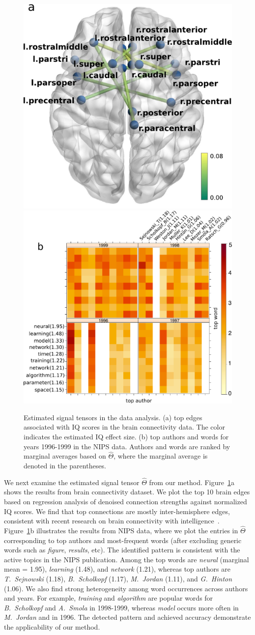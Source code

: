\documentclass[useAMS,usenatbib,usegraphicx,referee]{biom}
\theoremstyle{plain}
\theoremstyle{definition}
\begin{document}
\begin{figure}[h!]
\centering
\includegraphics[width=.36\textwidth]{figure/brainIQ.pdf}
\hspace{1cm}
\includegraphics[width=.45\textwidth]{figure/signal.pdf}
 \captionsetup{justification=raggedright,font=small}
\caption{Estimated signal tensors in the data analysis. (a) top edges associated with IQ scores in the brain connectivity data. The color indicates the estimated IQ effect size. (b) top authors and words for years 1996-1999 in the NIPS data. Authors and words are ranked by marginal averages based on $\hat \Theta$, where the marginal average is denoted in the parentheses.
}\label{fig:signal}
\end{figure}




We next examine the estimated signal tensor $\hat \Theta$ from our method. Figure~\ref{fig:signal}a shows the results from brain connectivity dataset. We plot the top 10 brain edges based on regression analysis of denoised connection strengths against normalized IQ scores. We find that top connections are mostly inter-hemisphere edges, consistent with recent research on brain connectivity with intelligence~\citep{li2009brain,wang2017bayesian}. Figure~\ref{fig:signal}b illustrates the results from NIPS data, where we plot the entries in $\hat \Theta$ corresponding to top authors and most-frequent words (after excluding generic words such as \emph{figure}, \emph{results}, etc). The identified pattern is consistent with the active topics in the NIPS publication. Among the top words are \emph{neural} (marginal mean = 1.95), \emph{learning} (1.48), and \emph{network} (1.21), whereas top authors are \emph{T.\ Sejnowski} (1.18), \emph{B.~Scholkopf} (1.17), \emph{M.\ Jordan} (1.11), and \emph{G.\ Hinton} (1.06). We also find strong heterogeneity among word occurrences across authors and years. For example, \emph{training} and \emph{algorithm} are popular words for \emph{B.\ Scholkopf} and \emph{A.\ Smola} in 1998-1999, whereas \emph{model} occurs more often in \emph{M.\ Jordan} and in 1996. The detected pattern and achieved accuracy demonstrate the applicability of our method.
\end{document}
